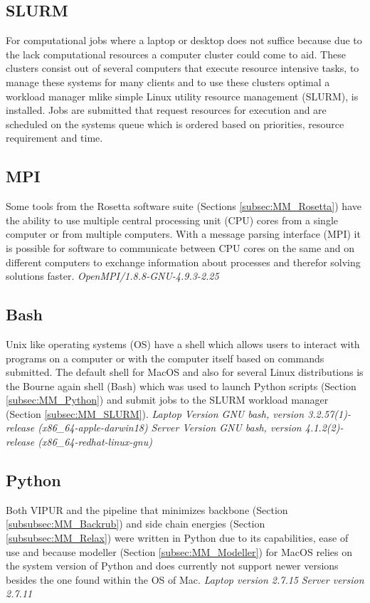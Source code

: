 \subsection{SLURM}
For computational jobs where a laptop or desktop does not suffice because due to the lack computational resources a computer cluster could come to aid. These clusters consist out of several computers that execute resource intensive tasks, to manage these systems for many clients and to use these clusters optimal a workload manager mlike simple Linux utility resource management (SLURM), is installed. Jobs are submitted that request resources for execution and are scheduled on the systems queue which is ordered based on priorities, resource requirement and time.
\label{subsec:MM_SLURM}

\subsection{MPI}
Some tools from the Rosetta software suite (Sections \ref{subsec:MM_Rosetta}) have the ability to use multiple central processing unit (CPU) cores from a single computer or from multiple computers. With a message parsing interface (MPI) it is possible for software to communicate between CPU cores on the same and on different computers to exchange information about processes and therefor solving solutions faster.
\label{MM_MPI}
\newline
\textit{OpenMPI/1.8.8-GNU-4.9.3-2.25}
\newline

\subsection{Bash}
Unix like operating systems (OS) have a shell which allows users to interact with programs on a computer or with the computer itself based on commands submitted.  The default shell for MacOS and also for several Linux distributions is the Bourne again shell (Bash) which was used to launch Python scripts (Section \ref{subsec:MM_Python}) and submit jobs to the SLURM workload manager (Section \ref{subsec:MM_SLURM}). 
\label{subsec:MM_Bash}
\newline
\textit{Laptop Version GNU bash, version 3.2.57(1)-release (x86\_64-apple-darwin18)}
\newline
\textit{Server Version GNU bash, version 4.1.2(2)-release (x86\_64-redhat-linux-gnu)}

\subsection{Python}
Both VIPUR and the pipeline that minimizes backbone (Section \ref{subsubsec:MM_Backrub}) and side chain energies (Section \ref{subsubsec:MM_Relax}) were written in Python due to its capabilities, ease of use and because modeller (Section \ref{subsec:MM_Modeller}) for MacOS relies on the system version of Python and does currently not support newer versions besides the one found within the OS of Mac.
\label{subsec:MM_Python}
\newline
\textit{Laptop version 2.7.15}
\newline
\textit{Server version 2.7.11}

